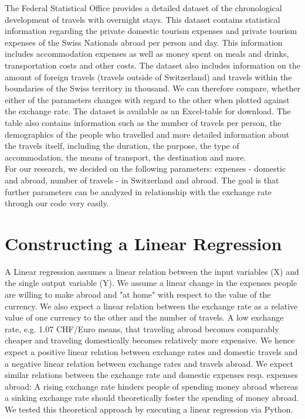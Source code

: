 \documentclass[12pt,a4paper,bibliography=totocnumbered,listof=totocnumbered]{scrartcl}
\begin{document}
The Federal Statistical Office provides a detailed dataset of the chronological development of travels with overnight stays. This dataset contains statistical information regarding the private domestic tourism expenses and private tourism expenses of the Swiss Nationals abroad per person and day. This information includes accommodation expenses as well as money spent on meals and drinks, transportation costs and other costs. The dataset also includes information on the amount of foreign travels (travels outside of Switzerland) and travels within the boundaries of the Swiss territory in thousand. We can therefore compare, whether either of the parameters changes with regard to the other when plotted against the exchange rate. The dataset is available as an Excel-table for download. The table also contains information such as the number of travels per person, the demographics of the people who travelled and more detailed information about the travels itself, including the duration, the purpose, the type of accommodation, the means of transport, the destination and more. \\     

For our research, we decided on the following parameters: expenses - domestic and abroad, number of travels - in Switzerland and abroad. The goal is that further parameters can be analyzed in relationship with the exchange rate through our code very easily. 



\newpage
\section{Constructing a Linear Regression}
A Linear regression assumes a linear relation between the input variables (X) and the single output variable (Y). We assume a linear change in the expenses people are willing to make abroad and "at home" with respect to the value of the currency. We also expect a linear relation between the exchange rate as a relative value of one currency to the other and the number of travels. A low exchange rate, e.g. 1.07 CHF/Euro means, that traveling abroad becomes comparably cheaper and traveling domestically becomes relatively more expensive. We hence expect a positive linear relation between exchange rates and domestic travels and a negative linear relation between exchange rates and travels abroad. We expect similar relations between the exchange rate and domestic expenses resp. expenses abroad: A rising exchange rate hinders people of spending money abroad whereas a sinking exchange rate should theoretically foster the spending of money abroad.\\ We tested this theoretical approach by executing a linear regression via Python. \\
\end{document}
